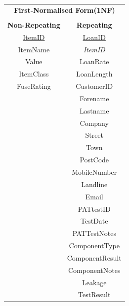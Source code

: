 \newpage

\begin{center}
    \begin{tabular}{|c|c|}
        \hline
        \multicolumn{2}{|c|}{\textbf{First-Normalised Form(1NF)}} \\
        \multicolumn{2}{|c|}{ }                                   \\ \hline
        \textbf{Non-Repeating} & \textbf{Repeating}               \\ \hline
        \underline{ItemID}     & \underline{LoanID}               \\ 
        ItemName               & \emph{ItemID}                    \\ 
        Value	              & LoanRate                         \\ 
        ItemClass	          & LoanLength                       \\ 
        FuseRating             & CustomerID                       \\ 
              	              & Forename                         \\ 
              	              & Lastname                         \\ 
                               & Company                          \\ 
                               & Street                           \\ 
                               & Town                             \\ 
                               & PostCode                         \\ 
                               & MobileNumber                     \\ 
                               & Landline                         \\ 
                               & Email                            \\ 
                               & PATtestID                        \\ 
                               & TestDate                         \\ 
                               & PATTestNotes                     \\ 
                               & ComponentType                    \\
                               & ComponentResult                  \\
                               & ComponentNotes                   \\
                               & Leakage                          \\ 
                               & TestResult                       \\ \hline
    \end{tabular}
\end{center}

